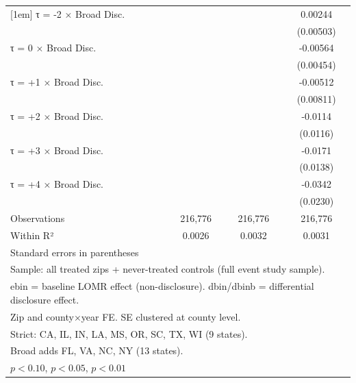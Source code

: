 \begin{table}[htbp]
\begin{tabular}{l*{3}{c}}
[1em]
τ = -2 × Broad Disc.&                     &                     &     0.00244         \\
                    &                     &                     &   (0.00503)         \\
[1em]
τ = 0 × Broad Disc. &                     &                     &    -0.00564         \\
                    &                     &                     &   (0.00454)         \\
[1em]
τ = +1 × Broad Disc.&                     &                     &    -0.00512         \\
                    &                     &                     &   (0.00811)         \\
[1em]
τ = +2 × Broad Disc.&                     &                     &     -0.0114         \\
                    &                     &                     &    (0.0116)         \\
[1em]
τ = +3 × Broad Disc.&                     &                     &     -0.0171         \\
                    &                     &                     &    (0.0138)         \\
[1em]
τ = +4 × Broad Disc.&                     &                     &     -0.0342         \\
                    &                     &                     &    (0.0230)         \\
\hline
Observations        &     216,776         &     216,776         &     216,776         \\
Within R²           &      0.0026         &      0.0032         &      0.0031         \\
\hline\hline
\multicolumn{4}{l}{\footnotesize Standard errors in parentheses}\\
\multicolumn{4}{l}{\footnotesize Sample: all treated zips + never-treated controls (full event study sample).}\\
\multicolumn{4}{l}{\footnotesize ebin = baseline LOMR effect (non-disclosure). dbin/dbinb = differential disclosure effect.}\\
\multicolumn{4}{l}{\footnotesize Zip and county×year FE. SE clustered at county level.}\\
\multicolumn{4}{l}{\footnotesize Strict: CA, IL, IN, LA, MS, OR, SC, TX, WI (9 states).}\\
\multicolumn{4}{l}{\footnotesize Broad adds FL, VA, NC, NY (13 states).}\\
\multicolumn{4}{l}{\footnotesize \sym{*} \(p<0.10\), \sym{**} \(p<0.05\), \sym{***} \(p<0.01\)}\\
\end{tabular}
\end{table}
